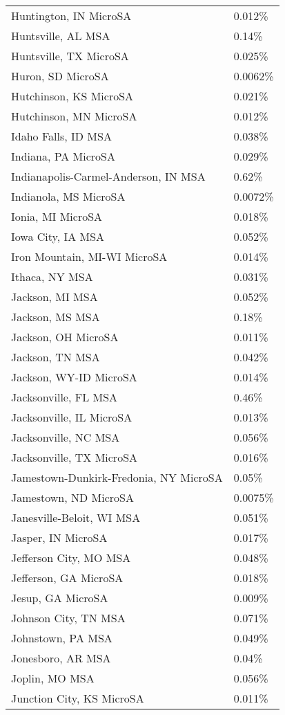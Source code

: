 \begin{longtable}[]{@{}ll@{}}
Huntington, IN MicroSA & 0.012\% \\
Huntsville, AL MSA & 0.14\% \\
Huntsville, TX MicroSA & 0.025\% \\
Huron, SD MicroSA & 0.0062\% \\
Hutchinson, KS MicroSA & 0.021\% \\
Hutchinson, MN MicroSA & 0.012\% \\
Idaho Falls, ID MSA & 0.038\% \\
Indiana, PA MicroSA & 0.029\% \\
Indianapolis-Carmel-Anderson, IN MSA & 0.62\% \\
Indianola, MS MicroSA & 0.0072\% \\
Ionia, MI MicroSA & 0.018\% \\
Iowa City, IA MSA & 0.052\% \\
Iron Mountain, MI-WI MicroSA & 0.014\% \\
Ithaca, NY MSA & 0.031\% \\
Jackson, MI MSA & 0.052\% \\
Jackson, MS MSA & 0.18\% \\
Jackson, OH MicroSA & 0.011\% \\
Jackson, TN MSA & 0.042\% \\
Jackson, WY-ID MicroSA & 0.014\% \\
Jacksonville, FL MSA & 0.46\% \\
Jacksonville, IL MicroSA & 0.013\% \\
Jacksonville, NC MSA & 0.056\% \\
Jacksonville, TX MicroSA & 0.016\% \\
Jamestown-Dunkirk-Fredonia, NY MicroSA & 0.05\% \\
Jamestown, ND MicroSA & 0.0075\% \\
Janesville-Beloit, WI MSA & 0.051\% \\
Jasper, IN MicroSA & 0.017\% \\
Jefferson City, MO MSA & 0.048\% \\
Jefferson, GA MicroSA & 0.018\% \\
Jesup, GA MicroSA & 0.009\% \\
Johnson City, TN MSA & 0.071\% \\
Johnstown, PA MSA & 0.049\% \\
Jonesboro, AR MSA & 0.04\% \\
Joplin, MO MSA & 0.056\% \\
Junction City, KS MicroSA & 0.011\% \\

\end{longtable}
